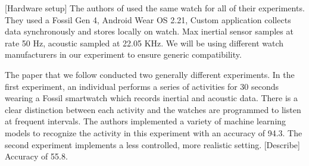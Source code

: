 \documentclass[conference]{IEEEtran}
\begin{document}
	[Hardware setup]
	The authors of \cite{2022_Leveraging_sound} used the same watch for all of their experiments. They used a Fossil Gen 4, Android Wear OS 2.21, Custom application collects data synchronously and stores locally on watch. Max inertial sensor samples at rate 50 Hz, acoustic sampled at 22.05 KHz. We will be using different watch manufacturers in our experiment to ensure generic compatibility.
	
	The paper that we follow conducted two generally different experiments. In the first experiment, an individual performs a series of activities for 30 seconds wearing a Fossil smartwatch which records inertial and acoustic data. There is a clear distinction between each activity and the watches are programmed to listen at frequent intervals. The authors implemented a variety of machine learning models to recognize the activity in this experiment with an accuracy of 94.3. The second experiment implements a less controlled, more realistic setting. [Describe] Accuracy of 55.8.
	
	
	
\end{document}
